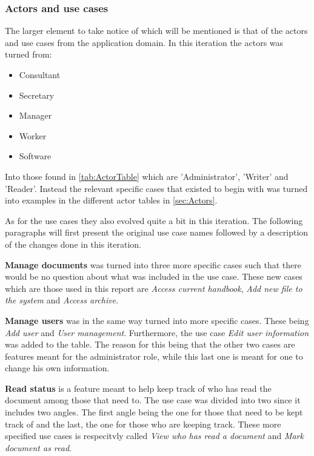 \subsubsection*{Actors and use cases}
The larger element to take notice of which will be mentioned is that of the actors and use cases from the application domain.
In this iteration the actors was turned from:
\begin{itemize}
	\item
	Consultant
	\item
	Secretary
	\item
	Manager
	\item
	Worker
	\item
	Software
\end{itemize}
Into those found in \cref{tab:ActorTable} which are 'Administrator', 'Writer' and 'Reader'. 
Instead the relevant specific cases that existed to begin with was turned into examples in the different actor tables in \cref{sec:Actors}.

As for the use cases they also evolved quite a bit in this iteration.
The following paragraphs will first present the original use case names followed by a description of the changes done in this iteration.

\textbf{Manage documents} was turned into three more specific cases such that there would be no question about what was included in the use case.
These new cases which are those used in this report are \textit{Access current handbook}, \textit{Add new file to the system} and \textit{Access archive}.

\textbf{Manage users} was in the same way turned into more specific cases.
These being \textit{Add user} and \textit{User management}.
Furthermore, the use case \textit{Edit user information} was added to the table.
The reason for this being that the other two cases are features meant for the administrator role, while this last one is meant for one to change his own information.

\textbf{Read status} is a feature meant to help keep track of who has read the document among those that need to.
The use case was divided into two since it includes two angles.
The first angle being the one for those that need to be kept track of and the last, the one for those who are keeping track.
These more specified use cases is respecitvly called \textit{View who has read a document} and \textit{Mark document as read}.

